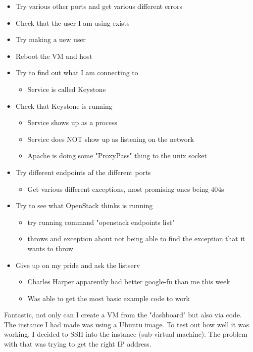 \documentclass[12pt]{article}
\begin{document}
\begin{itemize}
	\item Try various other ports and get various different errors
	\item Check that the user I am using exists
	\item Try making a new user
	\item Reboot the VM and host
	\item Try to find out what I am connecting to
	\begin{itemize}
		\item Service is called Keystone
	\end{itemize}
	\item Check that Keystone is running
	\begin{itemize}
		\item Service shows up as a process
		\item Service does NOT show up as listening on the network
		\item Apache is doing some "ProxyPass" thing to the unix socket
	\end{itemize}
	\item Try different endpoints af the different ports
	\begin{itemize}
		\item Get various different exceptions, most promising ones being 404s
	\end{itemize}
	\item Try to see what OpenStack thinks is running
	\begin{itemize}
		\item try running command "openstack endpoints list"
		\item throws and exception about not being able to find the exception that it wants to throw
	\end{itemize}
	\item Give up on my pride and ask the listserv
	\begin{itemize}
		\item Charles Harper apparently had better google-fu than me this week
		\item Was able to get the most basic example code to work
	\end{itemize}
\end{itemize}

Fantastic, not only can I create a VM from the "dashboard" but also via code.
The instance I had made was using a Ubuntu image.
To test out how well it was working, I decided to SSH into the instance (sub-virtual machine).
The problem with that was trying to get the right IP address.
\end{document}
